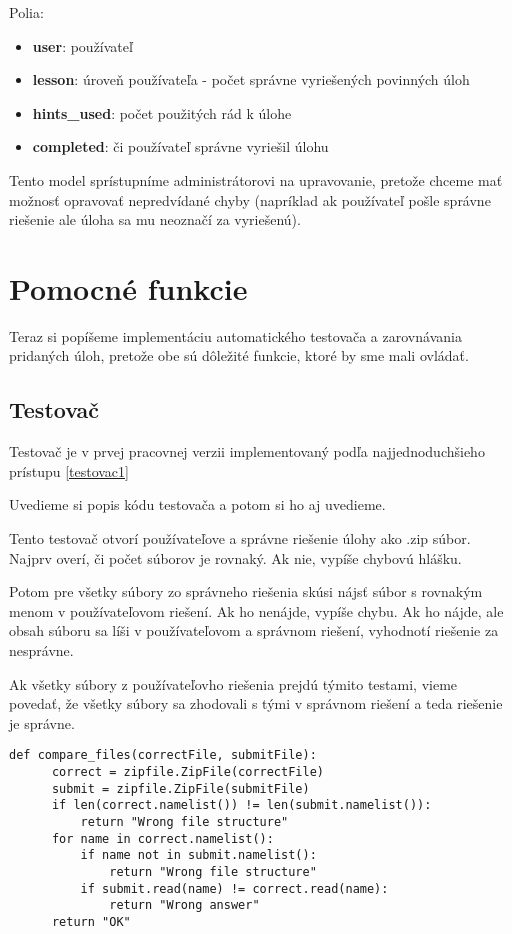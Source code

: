 Polia:
\begin{itemize}
\item \textbf{user}: používateľ
\item \textbf{lesson}: úroveň používateľa - počet správne vyriešených povinných úloh
\item \textbf{hints\_used}: počet použitých rád k úlohe
\item \textbf{completed}: či používateľ správne vyriešil úlohu
\end{itemize}

Tento model sprístupníme administrátorovi na upravovanie, pretože chceme mať možnosť
opravovať nepredvídané chyby (napríklad ak používateľ pošle správne riešenie ale
úloha sa mu neoznačí za vyriešenú).

\protect\section{Pomocné funkcie}
Teraz si popíšeme implementáciu automatického testovača a zarovnávania pridaných úloh, pretože obe sú dôležité
funkcie, ktoré by sme mali ovládať.
\subsection{Testovač}
Testovač je v prvej pracovnej verzii implementovaný podľa najjednoduchšieho prístupu \ref{testovac1}

Uvedieme si popis kódu testovača a potom si ho aj uvedieme.

Tento testovač otvorí používateľove a správne riešenie úlohy ako .zip súbor.
Najprv overí, či počet súborov je rovnaký. Ak nie, vypíše chybovú hlášku.

Potom pre všetky súbory zo správneho riešenia skúsi nájsť súbor s rovnakým menom
v používateľovom riešení. Ak ho nenájde, vypíše chybu. Ak ho nájde, ale obsah súboru sa líši v
používateľovom a správnom riešení, vyhodnotí riešenie za nesprávne.

Ak všetky súbory z používateľovho riešenia prejdú týmito testami, vieme povedať,
že všetky súbory sa zhodovali s tými v správnom riešení a teda riešenie je správne.

\begin{lstlisting}[title = testovač]
  def compare_files(correctFile, submitFile):
      correct = zipfile.ZipFile(correctFile)
      submit = zipfile.ZipFile(submitFile)
      if len(correct.namelist()) != len(submit.namelist()):
          return "Wrong file structure"
      for name in correct.namelist():
          if name not in submit.namelist():
              return "Wrong file structure"
          if submit.read(name) != correct.read(name):
              return "Wrong answer"
      return "OK"
\end{lstlisting}

